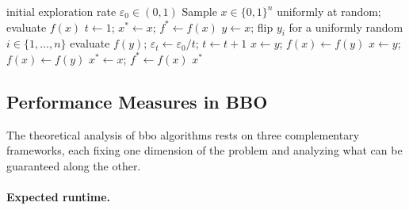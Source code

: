 \begin{algorithm}[H]
  \caption{Decaying-$\varepsilon$-Greedy RLS}
  \label{alg:rls-decay}
  \begin{algorithmic}[1]
    \Require initial exploration rate $\varepsilon_0 \in (0,1)$
    \State Sample $x \in \{0,1\}^n$ uniformly at random; evaluate $f(x)$
    \State $t \gets 1$;\; $x^{*} \gets x$;\; $f^{*} \gets f(x)$
    \Repeat
    \State $y \gets x$;\; flip $y_i$ for a uniformly random $i \in
    \{1,\ldots,n\}$
    \State evaluate $f(y)$;\; $\varepsilon_t \gets \varepsilon_0 /
    t$;\; $t \gets t + 1$
    \State $x \gets y$;\; $f(x) \gets f(y)$ 
    \State $x \gets y$;\; $f(x) \gets f(y)$ 
    \EndIf
     $x^{*} \gets x$;\; $f^{*} \gets f(x)$ \EndIf
    \State \Return $x^{*}$
  \end{algorithmic}
\end{algorithm}

\subsection{Performance Measures in BBO}
\label{subsec:bbo-perf}
The theoretical analysis of \acrshort{bbo} algorithms rests on three
complementary frameworks, each fixing one dimension of the problem and
analyzing what can be guaranteed along the other.

\paragraph{Expected runtime.}

